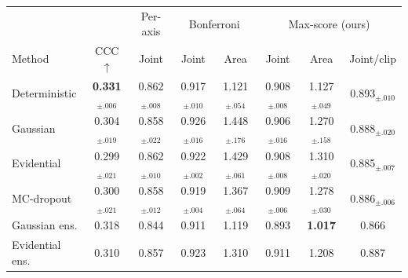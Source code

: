 \begin{tabular}{lccccccc}
\toprule
 & & Per-axis & \multicolumn{2}{c}{Bonferroni} & \multicolumn{3}{c}{Max-score (ours)} \\
Method & CCC$\uparrow$ & Joint & Joint & Area & Joint & Area & Joint/clip \\
\midrule
Deterministic & \textbf{0.331}$_{\pm.006}$ & 0.862$_{\pm.008}$ & 0.917$_{\pm.010}$ & 1.121$_{\pm.054}$ & 0.908$_{\pm.008}$ & 1.127$_{\pm.049}$ & 0.893$_{\pm.010}$ \\
Gaussian & 0.304$_{\pm.019}$ & 0.858$_{\pm.022}$ & 0.926$_{\pm.016}$ & 1.448$_{\pm.176}$ & 0.906$_{\pm.016}$ & 1.270$_{\pm.158}$ & 0.888$_{\pm.020}$ \\
Evidential & 0.299$_{\pm.021}$ & 0.862$_{\pm.010}$ & 0.922$_{\pm.002}$ & 1.429$_{\pm.061}$ & 0.908$_{\pm.008}$ & 1.310$_{\pm.020}$ & 0.885$_{\pm.007}$ \\
MC-dropout & 0.300$_{\pm.021}$ & 0.858$_{\pm.012}$ & 0.919$_{\pm.004}$ & 1.367$_{\pm.064}$ & 0.909$_{\pm.006}$ & 1.278$_{\pm.030}$ & 0.886$_{\pm.006}$ \\
Gaussian ens. & 0.318 & 0.844 & 0.911 & 1.119 & 0.893 & \textbf{1.017} & 0.866 \\
Evidential ens. & 0.310 & 0.857 & 0.923 & 1.310 & 0.911 & 1.208 & 0.887 \\
\bottomrule
\end{tabular}

